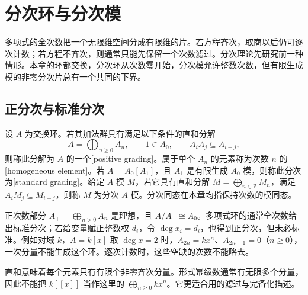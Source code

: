 
\section{分次环与分次模}
\label{b3:sec:1101}

多项式的全次数把一个无限维空间分成有限维的片。若方程齐次，取商以后仍可逐次计数；若方程不齐次，则通常只能先保留一个次数滤过。分次理论先研究前一种情形。本章的环都交换，分次环从次数零开始，分次模允许整数次数，但有限生成模的非零分次片总有一个共同的下界。

\subsection{正分次与标准分次}
\label{b3:subsec:1101:01}

\begin{definition}\label{b3:def:positive-standard-grading}
	设 \(A\) 为交换环。若其加法群具有满足以下条件的直和分解
	\[
		A=\bigoplus_{n\ge0}A_n,\qquad 1\in A_0,\qquad A_iA_j\subseteq A_{i+j},
	\]
	则称此分解为 \(A\) 的一个[positive grading]。属于单个 \(A_n\) 的元素称为次数 \(n\) 的[homogeneous element]。若 \(A=A_0[A_1]\)，且 \(A_1\) 是有限生成 \(A_0\) 模，则称此分次为[standard grading]。给定 \(A\) 模 \(M\)，若它具有直和分解 \(M=\bigoplus_{n\in\mathbb Z}M_n\)，满足 \(A_iM_j\subseteq M_{i+j}\)，则称 \(M\) 为分次 \(A\) 模。分次同态在本章均指保持次数的模同态。
\end{definition}

正次数部分 \(A_+=\bigoplus_{n>0}A_n\) 是理想，且 \(A/A_+\cong A_0\)。多项式环的通常全次数给出标准分次；若给变量赋正整数权 \(d_i\)，令 \(\deg x_i=d_i\)，也得到正分次，但未必标准。例如对域 \(k\)，\(A=k[x]\) 取 \(\deg x=2\) 时，\(A_{2n}=kx^n\)、\(A_{2n+1}=0\)（\(n\ge0\)），一次分量不能生成这个环。逐次计数时，这些空缺的次数不能略去。

\ProseParagraphBreak
直和意味着每个元素只有有限个非零齐次分量。形式幂级数通常有无限多个分量，因此不能把 \(k[\![x]\!]\) 当作这里的 \(\bigoplus_{n\ge0}kx^n\)。它更适合用的滤过与完备化描述。

